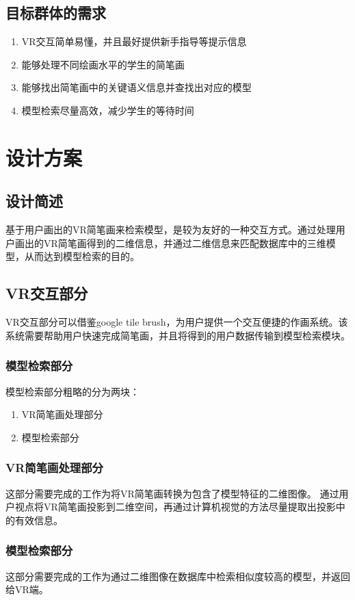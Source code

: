 \documentclass{article}
\begin{document}
\subsection{目标群体的需求}
\begin{enumerate}
    \item VR交互简单易懂，并且最好提供新手指导等提示信息
    \item 能够处理不同绘画水平的学生的简笔画
    \item 能够找出简笔画中的关键语义信息并查找出对应的模型
    \item 模型检索尽量高效，减少学生的等待时间
\end{enumerate}

\section{设计方案}
\subsection{设计简述}
基于用户画出的VR简笔画来检索模型，是较为友好的一种交互方式。通过处理用户画出的VR简笔画得到的二维信息，并通过二维信息来匹配数据库中的三维模型，从而达到模型检索的目的。  

\subsection{VR交互部分}
VR交互部分可以借鉴google tile brush，为用户提供一个交互便捷的作画系统。该系统需要帮助用户快速完成简笔画，并且将得到的用户数据传输到模型检索模块。

\subsubsection{模型检索部分}
模型检索部分粗略的分为两块：
\begin{enumerate}
    \item VR简笔画处理部分
    \item 模型检索部分
\end{enumerate}

\subsubsection{VR简笔画处理部分}
这部分需要完成的工作为将VR简笔画转换为包含了模型特征的二维图像。 
通过用户视点将VR简笔画投影到二维空间，再通过计算机视觉的方法尽量提取出投影中的有效信息。

\subsubsection{模型检索部分}
这部分需要完成的工作为通过二维图像在数据库中检索相似度较高的模型，并返回给VR端。
\end{document}

